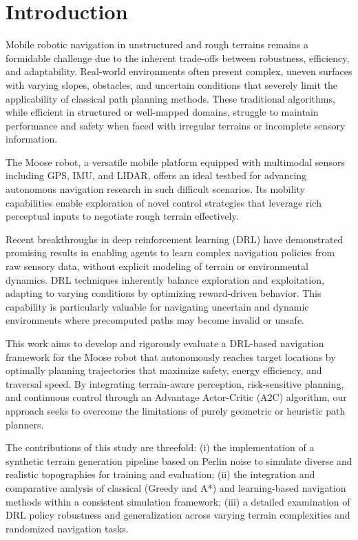 \documentclass[conference]{IEEEtran}
\begin{document}
\section{Introduction}
Mobile robotic navigation in unstructured and rough terrains remains a formidable challenge due to the inherent trade-offs between robustness, efficiency, and adaptability. Real-world environments often present complex, uneven surfaces with varying slopes, obstacles, and uncertain conditions that severely limit the applicability of classical path planning methods. These traditional algorithms, while efficient in structured or well-mapped domains, struggle to maintain performance and safety when faced with irregular terrains or incomplete sensory information.

The Moose robot, a versatile mobile platform equipped with multimodal sensors including GPS, IMU, and LIDAR, offers an ideal testbed for advancing autonomous navigation research in such difficult scenarios. Its mobility capabilities enable exploration of novel control strategies that leverage rich perceptual inputs to negotiate rough terrain effectively.

Recent breakthroughs in deep reinforcement learning (DRL) have demonstrated promising results in enabling agents to learn complex navigation policies from raw sensory data, without explicit modeling of terrain or environmental dynamics. DRL techniques inherently balance exploration and exploitation, adapting to varying conditions by optimizing reward-driven behavior. This capability is particularly valuable for navigating uncertain and dynamic environments where precomputed paths may become invalid or unsafe.

This work aims to develop and rigorously evaluate a DRL-based navigation framework for the Moose robot that autonomously reaches target locations by optimally planning trajectories that maximize safety, energy efficiency, and traversal speed. By integrating terrain-aware perception, risk-sensitive planning, and continuous control through an Advantage Actor-Critic (A2C) algorithm, our approach seeks to overcome the limitations of purely geometric or heuristic path planners.

The contributions of this study are threefold:
(i) the implementation of a synthetic terrain generation pipeline based on Perlin noise to simulate diverse and realistic topographies for training and evaluation;
(ii) the integration and comparative analysis of classical (Greedy and A*) and learning-based navigation methods within a consistent simulation framework;
(iii) a detailed examination of DRL policy robustness and generalization across varying terrain complexities and randomized navigation tasks.
\end{document}
